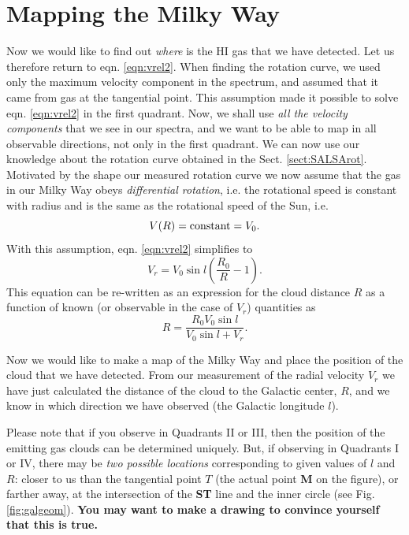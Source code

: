 \section{Mapping the Milky Way}
\label{sect:map}
Now we would like to find out {\em where} is the HI gas that we have detected.
Let us therefore return to eqn. \ref{eqn:vrel2}.  When finding the rotation
curve, we used only the maximum velocity component in the spectrum, and assumed
that it came from gas at the tangential point.  This assumption made it
possible to solve eqn. \ref{eqn:vrel2} in the first quadrant.  Now, we shall
use  {\em all the velocity components} that we see in our spectra, and we want
to be able to map in all observable directions, not only in the first quadrant. 
We can now use our knowledge about the rotation curve obtained in the Sect. \ref{sect:SALSArot}.
Motivated by the shape our measured rotation curve we now assume that the gas in our Milky Way 
obeys {\em differential rotation}, i.e. the rotational speed is
constant with radius and is the same as the rotational speed of the Sun, i.e.
\begin{equation}
	V(R) = {\rm constant} = V_0.
\end{equation}
With this assumption, eqn. \ref{eqn:vrel2} simplifies to 
\begin{equation}
V_r = V_0\sin l \left( \frac{R_0}{R} -1 \right).
\end{equation}
This equation can be re-written as an expression for the cloud distance $R$ as
a function of known (or observable in the case of $V_r$) quantities as
\begin{equation}
\boxed{
R = \frac{R_0 V_0 \sin l}{V_0 \sin l + V_r}.
}
\label{eqn:Rmap}
\end{equation}

Now we would like to make a map of the Milky Way and place the
position of the cloud that we have detected.  From our measurement of
the radial velocity $V_r$ we have just calculated the distance of the
cloud to the Galactic center, $R$, and we know in which direction we
have observed (the Galactic longitude $l$). 

Please note that if you observe in Quadrants II or III, then the position of
the emitting gas clouds can be determined uniquely. But, if observing in
Quadrants I or IV, there may be {\em two possible locations} corresponding to
given values of $l$ and $R$: closer to us than the tangential point $T$ (the
actual point {\bf M} on the figure), or farther away, at the intersection of
the {\bf ST} line and the inner circle (see Fig. \ref{fig:galgeom}).
{\bf You may want to make a drawing to convince yourself that
this is true.}

